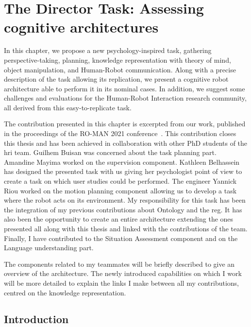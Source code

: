 \ifdefined{}
\else
\setcounter{chapter}{9} %
\dominitoc
\faketableofcontents
\fi

\chapter{The Director Task: Assessing cognitive architectures}
\minitoc
\label{chap:9}

In this chapter, we propose a new psychology-inspired task, gathering perspective-taking, planning, knowledge representation with theory of mind, object manipulation, and Human-Robot communication. Along with a precise description of the task allowing its replication, we present a cognitive robot architecture able to perform it in its nominal cases. In addition, we suggest some challenges and evaluations for the Human-Robot Interaction research community, all derived from this easy-to-replicate task.

The contribution presented in this chapter is excerpted from our work, published in the proceedings of the RO-MAN 2021 conference~\cite{sarthou_2021_director}. This contribution closes this thesis and has been achieved in collaboration with other PhD students of the \acrshort{hri} team. Guilhem Buisan was concerned about the task planning part. Amandine Mayima worked on the supervision component. Kathleen Belhassein has designed the presented task with us giving her psychologist point of view to create a task on which user studies could be performed. The engineer Yannick Riou worked on the motion planning component allowing us to develop a task where the robot acts on its environment. My responsibility for this task has been the integration of my previous contributions about Ontology and the \acrshort{reg}. It has also been the opportunity to create an entire architecture extending the ones presented all along with this thesis and linked with the contributions of the team. Finally, I have contributed to the Situation Assessment component and on the Language understanding part.

The components related to my teammates will be briefly described to give an overview of the architecture. The newly introduced capabilities on which I work will be more detailed to explain the links I make between all my contributions, centred on the knowledge representation.

\section{Introduction}

